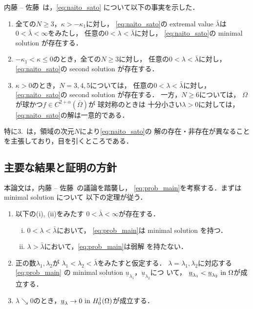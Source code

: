 内藤 -- 佐藤~\cite{MR2886160}は，\eqref{eq:naito_sato}
について以下の事実を示した．
\begin{enumerate}[1.] \sage
 \item 全ての$N \geq 3$，$\kappa > - \kappa_1$に対し，
       \eqref{eq:naito_sato}の extremal value $\bar{\lambda}$は
       $0 < \bar{\lambda} < \infty$をみたし，
       任意の$0 < \lambda < \bar{\lambda}$に対し，
       \eqref{eq:naito_sato}の minimal solution が存在する．
 \item $-\kappa_1 < \kappa \leq 0$のとき，全ての$N \geq 3$に対し，
       任意の$0 < \lambda < \bar{\lambda}$に対し，
       \eqref{eq:naito_sato}の second solution が存在する．
 \item $\kappa > 0$のとき，$N = 3, 4, 5$については，
       任意の$0 < \lambda < \bar{\lambda}$に対し，
       \eqref{eq:naito_sato}の second solution が存在する．
       一方，$N \geq 6$については，
       $\Omega$が球かつ$f \in C^{2+\alpha}(\bar{\Omega})$が
       球対称のときは
       十分小さい$\lambda > 0$に対しては，
       \eqref{eq:naito_sato}の解は一意的である．
\end{enumerate}
特に3.~は，領域の次元$N$により\eqref{eq:naito_sato}の
解の存在・非存在が異なることを主張しており，目を引くところである．

\subsection{主要な結果と証明の方針}

本論文は，内藤 -- 佐藤~\cite{MR2886160}の議論を踏襲し，
\ref{eq:prob_main}を考察する．まずは minimal solution について
以下の定理が従う．

\begin{thm} \label{thm:minimal_solution}
 \begin{enumerate}[1.] \sage
  \item 以下の(i), (ii)をみたす
        $0 < \bar{\lambda} < \infty$が存在する．
        \begin{enumerate}[(i)]
         \item $0 < \lambda < \bar{\lambda}$において，
               \ref{eq:prob_main}は minimal solution を持つ．
         \item $\lambda > \bar{\lambda}$において，\ref{eq:prob_main}は弱解
                を持たない．
        \end{enumerate}
  \item 正の数$\lambda_1, \lambda_2$が
        $\lambda_1 < \lambda_2 < \bar{\lambda}$をみたすと仮定する．
        $\lambda = \lambda_1, \lambda_2$に対応する\ref{eq:prob_main}
        の minimal solution
        $\underline{u}_{\lambda_1}$，$\underline{u}_{\lambda_2}$につ
        いて，
        $\underline{u}_{\lambda_1} < \underline{u}_{\lambda_2} ~\text{in}~
        \Omega$が成立する．
  \item $\lambda \searrow 0$のとき，$\underline{u}_\lambda \to 0 ~
        \text{in}~ H_0^1(\Omega)$が成立する． 
 \end{enumerate}
\end{thm}


